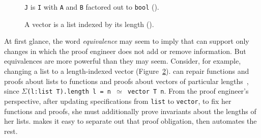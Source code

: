 \begin{figure}
\begin{minipage}{0.48\columnwidth}

\end{minipage}
\hfill
\begin{minipage}{0.48\columnwidth}

\end{minipage}
\vspace{-0.4cm}
\caption{\lstinline{J} is \lstinline{I} with \lstinline{A} and \lstinline{B} factored out to \lstinline{bool} ().}
\vspace{-0.1cm}
\label{fig:equivalence2}
\end{figure}

\begin{figure}
\begin{minipage}{0.48\textwidth}
   
\end{minipage}
\hfill
\begin{minipage}{0.58\textwidth}
   
\end{minipage}
\vspace{-0.4cm}
\caption{A vector is a list indexed by its length ().}
\label{fig:listtovect}
\end{figure}

\iffalse
\begin{figure*}
\begin{minipage}{0.40\textwidth}
   
\end{minipage}
\hfill
\begin{minipage}{0.58\textwidth}
   
\end{minipage}
\vspace{-0.4cm}
\caption{A vector (right) is a list (left) indexed by its length.}
\label{fig:listtovect}
\end{figure*}
\fi

At first glance, the word \textit{equivalence} may seem to imply that \toolname can support only changes in
which the proof engineer does not add or remove information.
But equivalences are more powerful than they may seem.
Consider, for example, changing a list to a length-indexed vector (Figure~\ref{fig:listtovect}).
\toolname can repair functions and proofs about lists to functions and proofs about vectors of particular lengths~, %
since $\Sigma$\lstinline{(l:list T).length l = n }$\simeq$\lstinline{ vector T n}.
From the proof engineer's perspective, after updating specifications from \lstinline{list} to \lstinline{vector},
to fix her functions and proofs, she must additionally prove invariants about the lengths of her lists.
\toolname makes it easy to separate out that proof obligation, then automates the rest.

